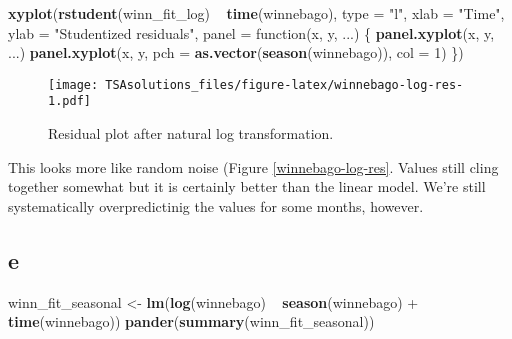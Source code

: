 \documentclass[]{book}
\newenvironment{Shaded}{\begin{snugshade}}{\end{snugshade}}
\newcommand{\KeywordTok}[1]{\textcolor[rgb]{0.13,0.29,0.53}{\textbf{{#1}}}}
\newcommand{\DataTypeTok}[1]{\textcolor[rgb]{0.13,0.29,0.53}{{#1}}}
\newcommand{\DecValTok}[1]{\textcolor[rgb]{0.00,0.00,0.81}{{#1}}}
\newcommand{\StringTok}[1]{\textcolor[rgb]{0.31,0.60,0.02}{{#1}}}
\newcommand{\NormalTok}[1]{{#1}}
\theoremstyle{definition}
\theoremstyle{definition}
\theoremstyle{remark}
\begin{document}
\begin{Shaded}
\begin{Highlighting}[]
\KeywordTok{xyplot}\NormalTok{(}\KeywordTok{rstudent}\NormalTok{(winn_fit_log) ~}\StringTok{ }\KeywordTok{time}\NormalTok{(winnebago), }\DataTypeTok{type =} \StringTok{"l"}\NormalTok{,}
       \DataTypeTok{xlab =} \StringTok{"Time"}\NormalTok{, }\DataTypeTok{ylab =} \StringTok{"Studentized residuals"}\NormalTok{,}
       \DataTypeTok{panel =} \NormalTok{function(x, y, ...) \{}
         \KeywordTok{panel.xyplot}\NormalTok{(x, y, ...)}
         \KeywordTok{panel.xyplot}\NormalTok{(x, y, }\DataTypeTok{pch =} \KeywordTok{as.vector}\NormalTok{(}\KeywordTok{season}\NormalTok{(winnebago)), }\DataTypeTok{col =} \DecValTok{1}\NormalTok{)}
       \NormalTok{\})}
\end{Highlighting}
\end{Shaded}

\begin{figure}[htbp]
\centering
\texttt{[image: TSAsolutions\_files/figure-latex/winnebago-log-res-1.pdf]}
\caption{\label{fig:winnebago-log-res}Residual plot after natural log
transformation.}
\end{figure}

This looks more like random noise (Figure \ref{winnebago-log-res}.
Values still cling together somewhat but it is certainly better than the
linear model. We're still systematically overpredictinig the values for
some months, however.

\subsection*{e}\label{e-3}

\begin{Shaded}
\begin{Highlighting}[]
\NormalTok{winn_fit_seasonal <-}\StringTok{ }\KeywordTok{lm}\NormalTok{(}\KeywordTok{log}\NormalTok{(winnebago) ~}\StringTok{ }\KeywordTok{season}\NormalTok{(winnebago) +}\StringTok{ }\KeywordTok{time}\NormalTok{(winnebago))}
\KeywordTok{pander}\NormalTok{(}\KeywordTok{summary}\NormalTok{(winn_fit_seasonal))}
\end{Highlighting}
\end{Shaded}
\end{document}
